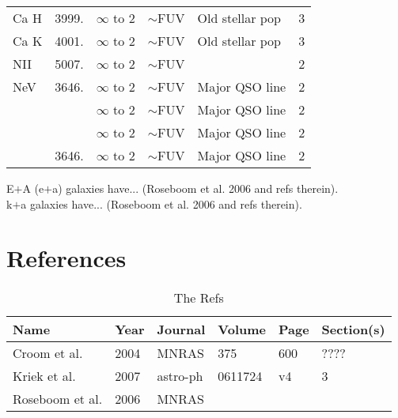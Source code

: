 \documentclass[11pt]{article}
\begin{document}
\begin{landscape}
\begin{table}
\begin{center}
\begin{tabular}{llllll}
      \hline
      Ca H             & 3999.   & $\infty$ to 2 & $\sim$FUV & Old stellar pop & 3 \\
      Ca K             & 4001.   & $\infty$ to 2 & $\sim$FUV & Old stellar pop & 3 \\
      \hline
      NII              & 5007.   & $\infty$ to 2 & $\sim$FUV &  & 2 \\
      \hline
      NeV              & 3646.   & $\infty$ to 2 & $\sim$FUV & Major QSO line & 2 \\
      \hline
      [OIII $\lambda$ 5007/ H$\beta$]   &    & $\infty$ to 2 & $\sim$FUV & Major QSO line & 2 \\
      \hline
      [NII $\lambda$ 6583/ H$\alpha$]   &    & $\infty$ to 2 & $\sim$FUV & Major QSO line & 2 \\
      \hline
      [$\alpha$/Fe]             & 3646.   & $\infty$ to 2 & $\sim$FUV & Major QSO line & 2 \\
      \hline
      \hline
    \end{tabular}
  \end{center}
\end{table}
\end{landscape}

\noindent
E$+$A (e$+$a) galaxies have... (Roseboom et al. 2006 and refs therein).\\
k$+$a         galaxies have... (Roseboom et al. 2006 and refs therein).\\



\section{References}

\begin{table}
  \caption{The Refs}
  \label{tab:the_ref}
  \begin{center}
    \begin{tabular}{llllll}
      \hline
      \hline 
      Name             & Year & Journal & Volume & Page & Section(s) \\
      \hline
      Croom et al.     & 2004 & MNRAS      & 375        & 600  & ???? \\
      Kriek et al.     & 2007 & astro-ph   & 0611724    & v4   & 3 \\
      Roseboom et al.  & 2006 & MNRAS      &            &      &   \\
      \hline
      \hline
    \end{tabular}
  \end{center}
\end{table}
\end{document}
